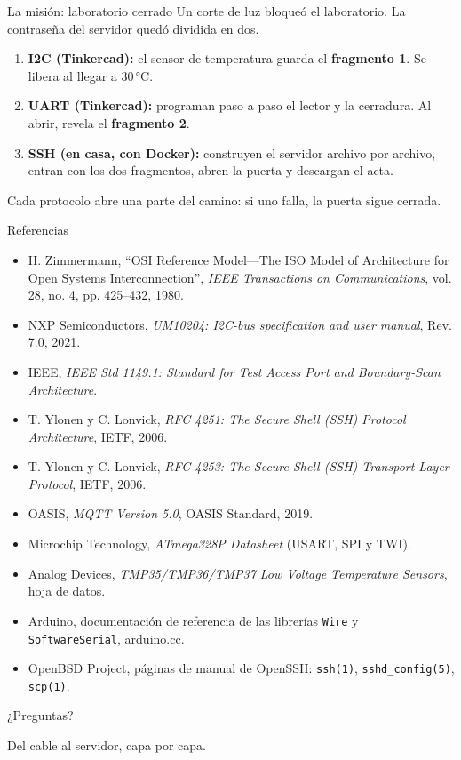 \documentclass[aspectratio=169,11pt]{beamer}
\begin{document}
\begin{frame}{La misión: laboratorio cerrado}
Un corte de luz bloqueó el laboratorio. La contraseña del servidor quedó \alert{dividida en dos}.
\vspace{0.5em}
\begin{enumerate}
  \item \textbf{I2C (Tinkercad):} el sensor de temperatura guarda el \textbf{fragmento 1}. Se libera al llegar a 30\,°C.
  \item \textbf{UART (Tinkercad):} programan paso a paso el lector y la cerradura. Al abrir, revela el \textbf{fragmento 2}.
  \item \textbf{SSH (en casa, con Docker):} construyen el servidor archivo por archivo, entran con los dos fragmentos, abren la puerta y descargan el acta.
\end{enumerate}
\vspace{0.5em}
{\footnotesize Cada protocolo abre una parte del camino: si uno falla, la puerta sigue cerrada.}
\end{frame}

\begin{frame}{Referencias}
\footnotesize
\begin{itemize}
  \item H. Zimmermann, ``OSI Reference Model---The ISO Model of Architecture for Open Systems Interconnection'', \emph{IEEE Transactions on Communications}, vol. 28, no. 4, pp. 425--432, 1980.
  \item NXP Semiconductors, \emph{UM10204: I2C-bus specification and user manual}, Rev. 7.0, 2021.
  \item IEEE, \emph{IEEE Std 1149.1: Standard for Test Access Port and Boundary-Scan Architecture}.
  \item T. Ylonen y C. Lonvick, \emph{RFC 4251: The Secure Shell (SSH) Protocol Architecture}, IETF, 2006.
  \item T. Ylonen y C. Lonvick, \emph{RFC 4253: The Secure Shell (SSH) Transport Layer Protocol}, IETF, 2006.
  \item OASIS, \emph{MQTT Version 5.0}, OASIS Standard, 2019.
  \item Microchip Technology, \emph{ATmega328P Datasheet} (USART, SPI y TWI).
  \item Analog Devices, \emph{TMP35/TMP36/TMP37 Low Voltage Temperature Sensors}, hoja de datos.
  \item Arduino, documentación de referencia de las librerías \texttt{Wire} y \texttt{SoftwareSerial}, arduino.cc.
  \item OpenBSD Project, páginas de manual de OpenSSH: \texttt{ssh(1)}, \texttt{sshd\_config(5)}, \texttt{scp(1)}.
\end{itemize}
\end{frame}

\begin{frame}[standout]
  ¿Preguntas?
  \vspace{1em}

  {\normalsize Del cable al servidor, capa por capa.}
\end{frame}
\end{document}
